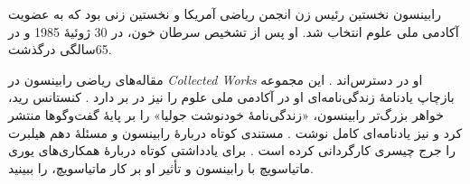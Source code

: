 \documentclass[../../../include/open-logic-section]{subfiles}
\begin{document}
رابینسون نخستین رئیس زن انجمن ریاضی آمریکا و نخستین زنی بود که به
عضویت آکادمی ملی علوم انتخاب شد. او پس از تشخیص سرطان خون، در
30 ژوئیهٔ 1985 و در 65سالگی درگذشت.

\begin{reading}
مقاله‌های ریاضی رابینسون در \textit{Collected Works} او در دسترس‌اند
\citep{Robinson1996}. این مجموعه بازچاپ یادنامهٔ زندگی‌نامه‌ای او در
آکادمی ملی علوم را نیز در بر دارد \citep{Feferman1994}. کنستانس رید،
خواهر بزرگ‌تر رابینسون، «زندگی‌نامهٔ خودنوشت جولیا» را بر پایهٔ
گفت‌وگوها منتشر کرد \citep{Reid1986} و نیز یادنامه‌ای کامل نوشت
\citep{Reid1996}. مستندی کوتاه دربارهٔ رابینسون و مسئلهٔ دهم هیلبرت را
جرج چیسری کارگردانی کرده است \citep{Csicsery2016}. برای یادداشتی کوتاه
دربارهٔ همکاری‌های یوری ماتیاسویچ با رابینسون و تأثیر او بر کار
ماتیاسویچ، \citep{Matijasevich1992} را ببینید.
\end{reading}
\end{document}
